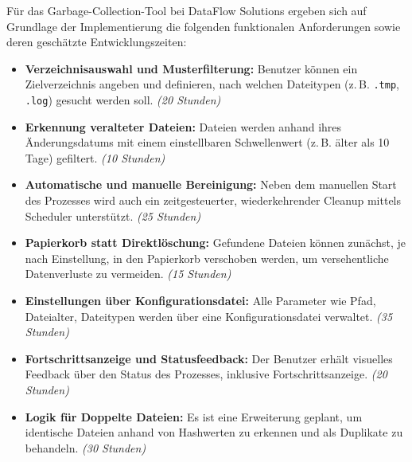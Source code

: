 Für das Garbage-Collection-Tool bei DataFlow Solutions ergeben sich auf Grundlage der Implementierung die folgenden funktionalen Anforderungen sowie deren geschätzte Entwicklungszeiten:

\begin{itemize}
  \item \textbf{Verzeichnisauswahl und Musterfilterung:} Benutzer können ein Zielverzeichnis angeben und definieren, nach welchen Dateitypen (z.\,B. \texttt{.tmp}, \texttt{.log}) gesucht werden soll. \textit{(20 Stunden)}

  \item \textbf{Erkennung veralteter Dateien:} Dateien werden anhand ihres Änderungsdatums mit einem einstellbaren Schwellenwert (z.\,B. älter als 10 Tage) gefiltert. \textit{(10 Stunden)}

  \item \textbf{Automatische und manuelle Bereinigung:} Neben dem manuellen Start des Prozesses wird auch ein zeitgesteuerter, wiederkehrender Cleanup mittels Scheduler unterstützt. \textit{(25 Stunden)}

  \item \textbf{Papierkorb statt Direktlöschung:} Gefundene Dateien können zunächst, je nach Einstellung, in den Papierkorb verschoben werden, um versehentliche Datenverluste zu vermeiden. \textit{(15 Stunden)}

  \item \textbf{Einstellungen über Konfigurationsdatei:} Alle Parameter wie Pfad, Dateialter, Dateitypen werden über eine Konfigurationsdatei verwaltet. \textit{(35 Stunden)}

  \item \textbf{Fortschrittsanzeige und Statusfeedback:} Der Benutzer erhält visuelles Feedback über den Status des Prozesses, inklusive Fortschrittsanzeige. \textit{(20 Stunden)}

  \item \textbf{Logik für Doppelte Dateien:} Es ist eine Erweiterung geplant, um identische Dateien anhand von Hashwerten zu erkennen und als Duplikate zu behandeln. \textit{(30 Stunden)}
\end{itemize}
